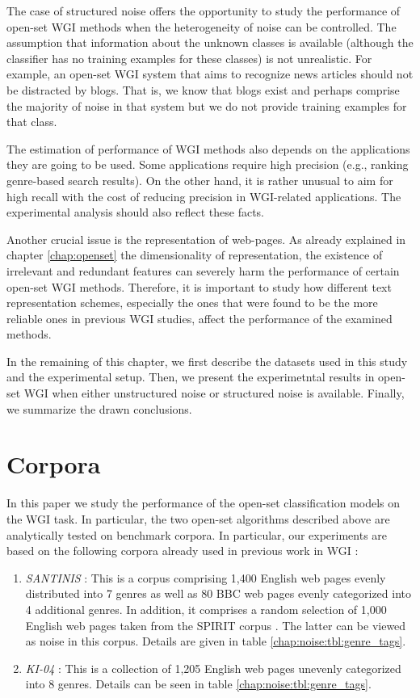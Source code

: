 The case of structured noise offers the opportunity to study the performance of open-set WGI methods when the heterogeneity of noise can be controlled. The assumption that information about the unknown classes is available (although the classifier has no training examples for these classes) is not unrealistic. For example, an open-set WGI system that aims to recognize news articles should not be distracted by blogs. That is, we know that blogs exist and perhaps comprise the majority of noise in that system but we do not provide training examples for that class.

The estimation of performance of WGI methods also depends on the applications they are going to be used. Some applications require high precision (e.g., ranking genre-based search results). On the other hand, it is rather unusual to aim for high recall with the cost of reducing precision in WGI-related applications. The experimental analysis should also reflect these facts.

Another crucial issue is the representation of web-pages. As already explained in chapter \ref{chap:openset} the dimensionality of representation, the existence of irrelevant and redundant features can severely harm the performance of certain open-set WGI methods. Therefore, it is important to study how different text representation schemes, especially the ones that were found to be the more reliable ones in previous WGI studies, affect the performance of the examined methods. 

In the remaining of this chapter, we first describe the datasets used in this study and the experimental setup. Then, we present the experimetntal results in open-set WGI when either unstructured noise or structured noise is available. Finally, we summarize the drawn conclusions.

\section{Corpora}\label{chap:noise:sec:corpora}
In this paper we study the performance of the open-set classification models on the WGI task. In particular, the two open-set algorithms described above are analytically tested on benchmark corpora. In particular, our experiments are based on the following corpora already used in previous work in WGI \parencite{meyer2004genre,santini2007automatic,kanaris2009learning}:

\begin{enumerate}
	\item \textit{SANTINIS} \parencite{mehler2010genres_on_web}: This is a corpus comprising 1,400 English web pages evenly distributed into 7 genres as well as 80 BBC web pages evenly categorized into 4 additional genres. In addition, it comprises a random selection of 1,000 English web pages taken from the SPIRIT corpus \parencite{joho2004spirit}. The latter can be viewed as noise in this corpus. Details are given in table \ref{chap:noise:tbl:genre_tags}.
	\item \textit{KI-04} \parencite{meyer2004genre}: This is a collection of 1,205 English web pages unevenly categorized into 8 genres. Details can be seen in table \ref{chap:noise:tbl:genre_tags}.
\end{enumerate}


